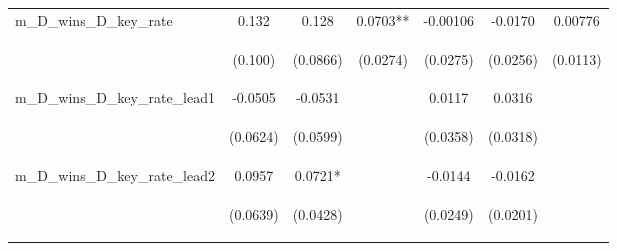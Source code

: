 \documentclass[]{article}
\begin{document}
\begin{center}
\begin{tabular}{lcccccc}
m\_D\_wins\_D\_key\_rate & 0.132 & 0.128 & 0.0703** & -0.00106 & -0.0170 & 0.00776 \\
\vspace{4pt} & \begin{footnotesize}(0.100)\end{footnotesize} & \begin{footnotesize}(0.0866)\end{footnotesize} & \begin{footnotesize}(0.0274)\end{footnotesize} & \begin{footnotesize}(0.0275)\end{footnotesize} & \begin{footnotesize}(0.0256)\end{footnotesize} & \begin{footnotesize}(0.0113)\end{footnotesize} \\
m\_D\_wins\_D\_key\_rate\_lead1 & -0.0505 & -0.0531 &  & 0.0117 & 0.0316 &  \\
\vspace{4pt} & \begin{footnotesize}(0.0624)\end{footnotesize} & \begin{footnotesize}(0.0599)\end{footnotesize} & \begin{footnotesize}\end{footnotesize} & \begin{footnotesize}(0.0358)\end{footnotesize} & \begin{footnotesize}(0.0318)\end{footnotesize} & \begin{footnotesize}\end{footnotesize} \\
m\_D\_wins\_D\_key\_rate\_lead2 & 0.0957 & 0.0721* &  & -0.0144 & -0.0162 &  \\
\vspace{4pt} & \begin{footnotesize}(0.0639)\end{footnotesize} & \begin{footnotesize}(0.0428)\end{footnotesize} & \begin{footnotesize}\end{footnotesize} & \begin{footnotesize}(0.0249)\end{footnotesize} & \begin{footnotesize}(0.0201)\end{footnotesize} & \begin{footnotesize}\end{footnotesize} \\

\end{tabular}
\end{center}
\end{document}
